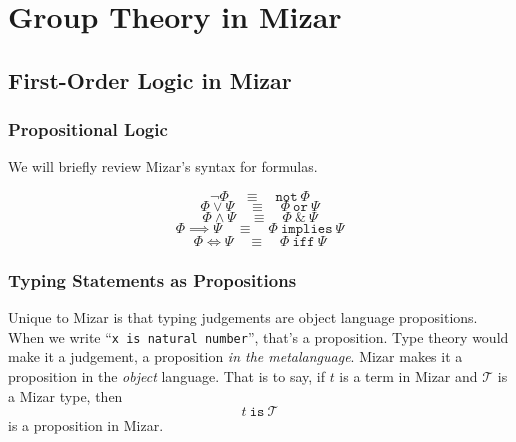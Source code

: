 \chapter{Group Theory in Mizar}

\section{First-Order Logic in Mizar}

\subsection{Propositional Logic}
We will briefly review Mizar's syntax for formulas.

\begin{equation}
  \neg\Phi\quad\equiv\quad\mathtt{not}~\Phi
\end{equation}
\begin{equation}
  \Phi\lor\Psi\quad\equiv\quad\Phi~\mathtt{or}~\Psi
\end{equation}
\begin{equation}
  \Phi\land\Psi\quad\equiv\quad\Phi~\mathtt{\&}~\Psi
\end{equation}
\begin{equation}
  \Phi\implies\Psi\quad\equiv\quad\Phi~\mathtt{implies}~\Psi
\end{equation}
\begin{equation}
  \Phi\iff\Psi\quad\equiv\quad\Phi~\mathtt{iff}~\Psi
\end{equation}

\subsection{Typing Statements as Propositions}
Unique to Mizar is that typing judgements are object language
propositions. When we write ``\texttt{x is natural number}'', that's a
proposition. Type theory would make it a judgement, a proposition
\emph{in the metalanguage}. Mizar makes it a proposition in the
\emph{object} language. That is to say, if $t$ is a term in Mizar and
$\mathcal{T}$ is a Mizar type, then
\begin{equation}
  t~\mathtt{is}~\mathcal{T}
\end{equation}
is a proposition in Mizar.

